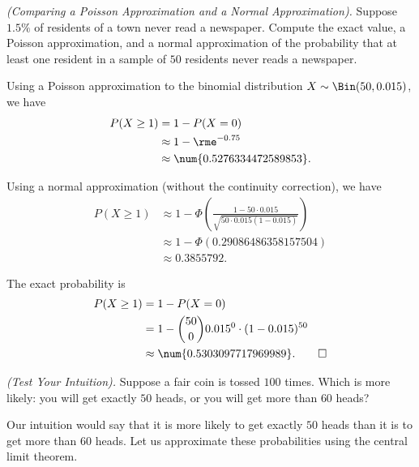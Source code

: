 \begin{problem}[Handout 14, \# 9]
  \emph{(Comparing a Poisson Approximation and a Normal Approximation).}
  Suppose \(1.5\%\) of residents of a town never read a newspaper. Compute
  the exact value, a Poisson approximation, and a normal approximation of
  the probability that at least one resident in a sample of \(50\)
  residents never reads a newspaper.
\end{problem}
\begin{solution}
  Using a Poisson approximation to the binomial distribution
  \(X\sim\Bin(50,0.015)\), we have
  \begin{align*}
    P(X\geq 1)
    &=1-P(X=0)\\
    &\approx 1-\rme^{-0.75}\\
    &\approx\num{0.5276334472589853}.
  \end{align*}

  Using a normal approximation (without the continuity correction), we have
  \begin{align*}
    P(X\geq 1)
    &\approx 1-
      \Phi\left(\frac{1-50\cdot 0.015}{\sqrt{50\cdot
      0.015(1-0.015)}}\right)\\
    &\approx 1-\Phi(\num{0.29086486358157504})\\
    &\approx\num{0.3855792}.
  \end{align*}

  The exact probability is
  \begin{align*}
    P(X\geq 1)
    &=1-P(X=0)\\
    &=1-\binom{50}{0}0.015^0\cdot(1-0.015)^{50}\\
    &\approx\num{0.5303097717969989}.\qedhere
  \end{align*}
\end{solution}
\newpage

\begin{problem}[Handout 14, \# 10]
  \emph{(Test Your Intuition).} Suppose a fair coin is tossed \(100\)
  times. Which is more likely: you will get exactly \(50\) heads, or you
  will get more than \(60\) heads?
\end{problem}
\begin{solution}
  Our intuition would say that it is more likely to get exactly \(50\)
  heads than it is to get more than \(60\) heads. Let us approximate these
  probabilities using the central limit theorem.
\end{solution}
\newpage

